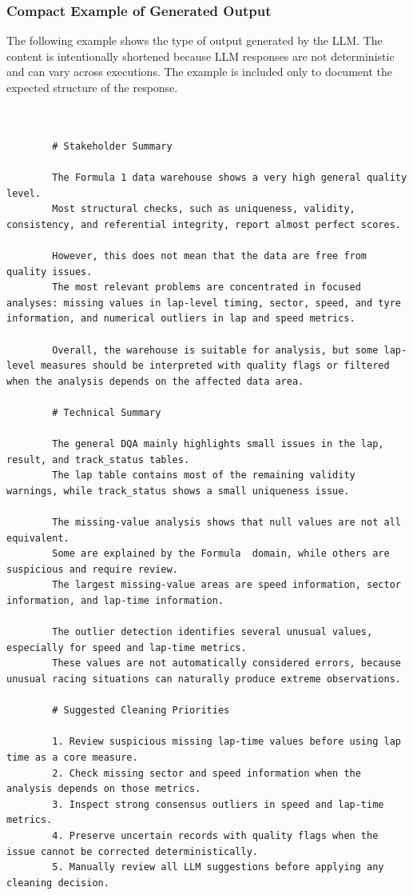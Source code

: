 \documentclass[11pt,a4paper]{article}
\begin{document}
	\vspace{2em}
	\subsubsection*{Compact Example of Generated Output}
	
	\vspace{2em}
	The following example shows the type of output generated by the LLM. 
	The content is intentionally shortened because LLM responses are not deterministic and can vary across executions. 
	The example is included only to document the expected structure of the response.
	
	\vspace{4em}
	\begin{lstlisting}
		
		
		# Stakeholder Summary
		
		The Formula 1 data warehouse shows a very high general quality level. 
		Most structural checks, such as uniqueness, validity, consistency, and referential integrity, report almost perfect scores.
		
		However, this does not mean that the data are free from quality issues. 
		The most relevant problems are concentrated in focused analyses: missing values in lap-level timing, sector, speed, and tyre information, and numerical outliers in lap and speed metrics.
		
		Overall, the warehouse is suitable for analysis, but some lap-level measures should be interpreted with quality flags or filtered when the analysis depends on the affected data area.
		
		# Technical Summary
		
		The general DQA mainly highlights small issues in the lap, result, and track_status tables. 
		The lap table contains most of the remaining validity warnings, while track_status shows a small uniqueness issue.
		
		The missing-value analysis shows that null values are not all equivalent. 
		Some are explained by the Formula  domain, while others are suspicious and require review. 
		The largest missing-value areas are speed information, sector information, and lap-time information.
		
		The outlier detection identifies several unusual values, especially for speed and lap-time metrics. 
		These values are not automatically considered errors, because unusual racing situations can naturally produce extreme observations.
		
		# Suggested Cleaning Priorities
		
		1. Review suspicious missing lap-time values before using lap time as a core measure.
		2. Check missing sector and speed information when the analysis depends on those metrics.
		3. Inspect strong consensus outliers in speed and lap-time metrics.
		4. Preserve uncertain records with quality flags when the issue cannot be corrected deterministically.
		5. Manually review all LLM suggestions before applying any cleaning decision.
		
		
	\end{lstlisting}
	
\end{document}
